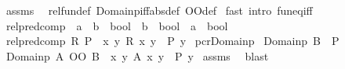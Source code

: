 \begin{isabellebody}
%
\isadelimproof
%
\endisadelimproof
%
\isatagproof
{}\isamarkupfalse%
\ assms\ \isamarkupfalse%
\ rel{\isacharunderscore}{\kern0pt}fun{\isacharunderscore}{\kern0pt}def\ Domainp{\isacharunderscore}{\kern0pt}iff{\isacharbrackleft}{\kern0pt}abs{\isacharunderscore}{\kern0pt}def{\isacharbrackright}{\kern0pt}\ OO{\isacharunderscore}{\kern0pt}def\isanewline
{}\isamarkupfalse%
\ {\isacharparenleft}{\kern0pt}fast\ intro{\isacharcolon}{\kern0pt}\ fun{\isacharunderscore}{\kern0pt}eq{\isacharunderscore}{\kern0pt}iff{\isacharparenright}{\kern0pt}%
\endisatagproof
{\isafoldproof}%
%
\isadelimproof
\isanewline
%
\endisadelimproof
\isanewline
{}\isamarkupfalse%
\ rel{\isacharunderscore}{\kern0pt}pred{\isacharunderscore}{\kern0pt}comp\ {\isacharcolon}{\kern0pt}{\isacharcolon}{\kern0pt}\ {\isachardoublequoteopen}{\isacharparenleft}{\kern0pt}{\isacharprime}{\kern0pt}a\ {\isacharequal}{\kern0pt}{\isachargreater}{\kern0pt}\ {\isacharprime}{\kern0pt}b\ {\isacharequal}{\kern0pt}{\isachargreater}{\kern0pt}\ bool{\isacharparenright}{\kern0pt}\ {\isacharequal}{\kern0pt}{\isachargreater}{\kern0pt}\ {\isacharparenleft}{\kern0pt}{\isacharprime}{\kern0pt}b\ {\isacharequal}{\kern0pt}{\isachargreater}{\kern0pt}\ bool{\isacharparenright}{\kern0pt}\ {\isacharequal}{\kern0pt}{\isachargreater}{\kern0pt}\ {\isacharprime}{\kern0pt}a\ {\isacharequal}{\kern0pt}{\isachargreater}{\kern0pt}\ bool{\isachardoublequoteclose}\isanewline
{}\ {\isachardoublequoteopen}rel{\isacharunderscore}{\kern0pt}pred{\isacharunderscore}{\kern0pt}comp\ R\ P\ {\isasymequiv}\ {\isasymlambda}x{\isachardot}{\kern0pt}\ {\isasymexists}y{\isachardot}{\kern0pt}\ R\ x\ y\ {\isasymand}\ P\ y{\isachardoublequoteclose}\isanewline
\isanewline
{}\isamarkupfalse%
\ pcr{\isacharunderscore}{\kern0pt}Domainp{\isacharcolon}{\kern0pt}\isanewline
{}\ {\isachardoublequoteopen}Domainp\ B\ {\isacharequal}{\kern0pt}\ P{\isachardoublequoteclose}\isanewline
{}\ {\isachardoublequoteopen}Domainp\ {\isacharparenleft}{\kern0pt}A\ OO\ B{\isacharparenright}{\kern0pt}\ {\isacharequal}{\kern0pt}\ {\isacharparenleft}{\kern0pt}{\isasymlambda}x{\isachardot}{\kern0pt}\ {\isasymexists}y{\isachardot}{\kern0pt}\ A\ x\ y\ {\isasymand}\ P\ y{\isacharparenright}{\kern0pt}{\isachardoublequoteclose}\isanewline
%
\isadelimproof
%
\endisadelimproof
%
\isatagproof
{}\isamarkupfalse%
\ assms\ \isamarkupfalse%
\ blast%
\endisatagproof
{\isafoldproof}%
%
\isadelimproof
\isanewline
%
\endisadelimproof

\end{isabellebody}
